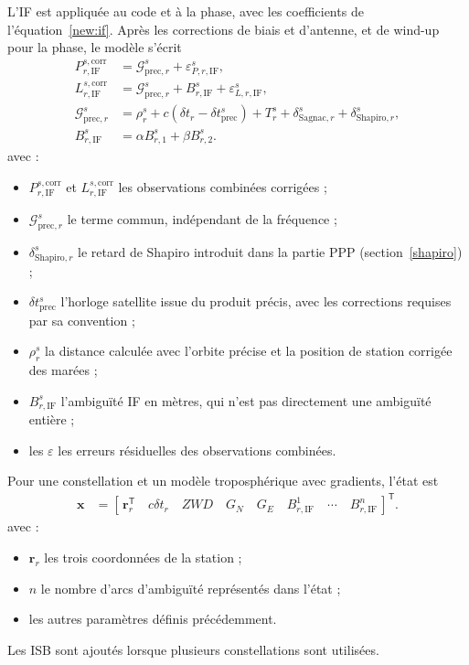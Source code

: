 L'IF est appliquée au code et à la phase, avec les coefficients de
l'équation~\eqref{new:if}. Après les corrections de biais et d'antenne, et de
wind-up pour la phase, le modèle s'écrit
\begin{align}
P_{r,\mathrm{IF}}^{s,\mathrm{corr}}&=
\mathcal G_{\mathrm{prec},r}^s+\varepsilon_{P,r,\mathrm{IF}}^s,\\
L_{r,\mathrm{IF}}^{s,\mathrm{corr}}&=
\mathcal G_{\mathrm{prec},r}^s+B_{r,\mathrm{IF}}^s+\varepsilon_{L,r,\mathrm{IF}}^s,\\
\mathcal G_{\mathrm{prec},r}^s&=\rho_r^s+c(\delta t_r-\delta t_{\mathrm{prec}}^s)
+T_r^s+\delta_{\mathrm{Sagnac},r}^s+\delta_{\mathrm{Shapiro},r}^s,\\
B_{r,\mathrm{IF}}^s&=\alpha B_{r,1}^s+\beta B_{r,2}^s.
\label{new:ppp_model}
\end{align}
avec :
\begin{itemize}
\item $P_{r,\mathrm{IF}}^{s,\mathrm{corr}}$ et
$L_{r,\mathrm{IF}}^{s,\mathrm{corr}}$ les observations combinées corrigées ;
\item $\mathcal G_{\mathrm{prec},r}^s$ le terme commun, indépendant de la fréquence ;
\item $\delta_{\mathrm{Shapiro},r}^s$ le retard de Shapiro introduit dans
la partie PPP (section~\ref{shapiro}) ;
\item $\delta t_{\mathrm{prec}}^s$ l'horloge satellite issue du produit précis,
avec les corrections requises par sa convention ;
\item $\rho_r^s$ la distance calculée avec l'orbite précise et la position de
station corrigée des marées ;
\item $B_{r,\mathrm{IF}}^s$ l'ambiguïté IF en mètres, qui n'est pas directement
une ambiguïté entière ;
\item les $\varepsilon$ les erreurs résiduelles des observations combinées.
\end{itemize}

Pour une constellation et un modèle troposphérique avec gradients, l'état est
\begin{align}
\mathbf x&=[\,\mathbf r_r^{\mathsf T}\quad c\delta t_r\quad ZWD\quad
G_N\quad G_E\quad B_{r,\mathrm{IF}}^1\quad\cdots\quad
B_{r,\mathrm{IF}}^n\,]^{\mathsf T}.
\label{new:ppp_state}
\end{align}
avec :
\begin{itemize}
\item $\mathbf r_r$ les trois coordonnées de la station ;
\item $n$ le nombre d'arcs d'ambiguïté représentés dans l'état ;
\item les autres paramètres définis précédemment.
\end{itemize}
Les ISB sont ajoutés lorsque plusieurs constellations sont utilisées.

